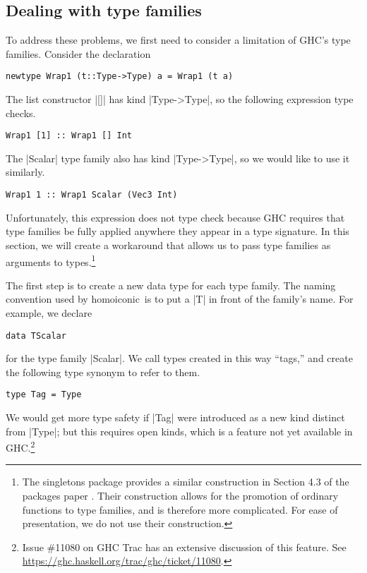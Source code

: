 \documentclass[preprint]{sigplanconf}
\theoremstyle{definition}
\newcommand{\homoiconic}{{\ttfamily homoiconic}~}
\begin{document}
\subsection{Dealing with type families}
To address these problems, we first need to consider a limitation of GHC's type families.
Consider the declaration
\begin{lstlisting}
newtype Wrap1 (t::Type->Type) a = Wrap1 (t a)
\end{lstlisting}
The list constructor |[]| has kind |Type->Type|,
so the following expression type checks.
\begin{lstlisting}
Wrap1 [1] :: Wrap1 [] Int
\end{lstlisting}
The |Scalar| type family also has kind |Type->Type|,
so we would like to use it similarly.
\begin{lstlisting}
Wrap1 1 :: Wrap1 Scalar (Vec3 Int)
\end{lstlisting}
Unfortunately, this expression does not type check because GHC requires that type families be fully applied anywhere they appear in a type signature.
In this section, we will create a workaround that allows us to pass type families as arguments to types.\footnote{
    The {\ttfamily singletons} package provides a similar construction in Section 4.3 of the packages paper \cite{eisenberg2015promoting}.
    Their construction allows for the promotion of ordinary functions to type families,
    and is therefore more complicated.
    For ease of presentation, we do not use their construction.
}

The first step is to create a new data type for each type family.
The naming convention used by \homoiconic is to put a |T| in front of the family's name.
For example, we declare
\begin{lstlisting}
data TScalar
\end{lstlisting}
for the type family |Scalar|.
We call types created in this way ``tags,''
and create the following type synonym to refer to them.
\begin{lstlisting}
type Tag = Type
\end{lstlisting}
We would get more type safety if |Tag| were introduced as a new kind distinct from |Type|;
but this requires open kinds, which is a feature not yet available in GHC.\footnote{
    Issue \#11080 on GHC Trac has an extensive discussion of this feature.
    See \url{https://ghc.haskell.org/trac/ghc/ticket/11080}.
}
\end{document}
